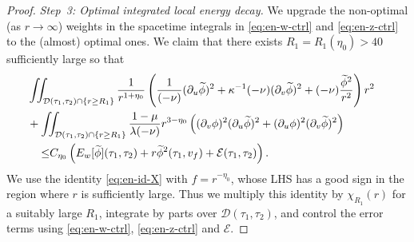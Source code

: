 \documentclass[10pt, reqno]{amsart}
\theoremstyle{definition}
\theoremstyle{remark}
\theoremstyle{conjecture}
\numberwithin{equation}{section}
\newcommand{\set}[1]{\{#1\}}
\newcommand{\rd}{\partial}
\newcommand{\0}{\emptyset}
\newcommand{\kpp}{\kappa}
\newcommand{\lmb}{\lambda}
\newcommand{\calD}{\mathcal D}
\newcommand{\calE}{\mathcal E}
\newcommand{\dur}{\nu}
\newcommand{\dvr}{\lmb}
\newcommand{\pfstep}[1]{\vspace{.5em} {\it \noindent #1.}}
\newcommand{\phibg}{\overline{\phi}}				%
\newcommand{\phidf}{\widetilde{\phi}}				%
\begin{document}
\begin{proof}
\pfstep{Step~3: Optimal integrated local energy decay}
We upgrade the non-optimal (as $r \to \infty$) weights in the spacetime integrals in \eqref{eq:en-w-ctrl} and \eqref{eq:en-z-ctrl} to the (almost) optimal ones. We claim that there exists $R_{1} = R_{1}(\eta_{0}) > 40$ sufficiently large so that
\begin{equation} \label{eq:en-far-ctrl}
\begin{aligned}
& \hskip-2em
\iint_{\calD(\tau_{1}, \tau_{2}) \cap \set{r \geq R_{1}}} \frac{1}{r^{1+\eta_{0}}} 
		 \left( \frac{1}{(-\dur)} (\rd_{u} \phidf)^{2} + \kpp^{-1} (-\dur) (\rd_{v} \phidf)^{2} + (-\dur) \frac{\phidf^{2}}{r^{2}} \right) r^{2} \\
& \hskip-2em
+ \iint_{\calD(\tau_{1}, \tau_{2}) \cap \set{r \geq R_{1}}} \frac{1-\mu}{\dvr (-\dur)} r^{3-\eta_{0}} \left((\rd_{v} \phi)^{2} (\rd_{u} \phidf)^{2} + (\rd_{u} \phi)^{2} (\rd_{v} \phidf)^{2} \right) \\
\leq & C_{\eta_{0}} \left( E_{w}[\phidf](\tau_{1}, \tau_{2}) + r \phidf^{2}(\tau_{1}, v_{f}) + \calE(\tau_{1}, \tau_{2}) \right).
\end{aligned}
\end{equation}
We use the identity \eqref{eq:en-id-X} with $f = r^{-\eta_{0}}$, whose LHS has a good sign in the region where $r$ is sufficiently large. Thus we multiply this identity by $\chi_{R_{1}}(r)$ for a suitably large $R_{1}$, integrate by parts over $\calD(\tau_{1}, \tau_{2})$, and control the error terms using \eqref{eq:en-w-ctrl}, \eqref{eq:en-z-ctrl} and $\calE$.


\end{proof}
\end{document}
